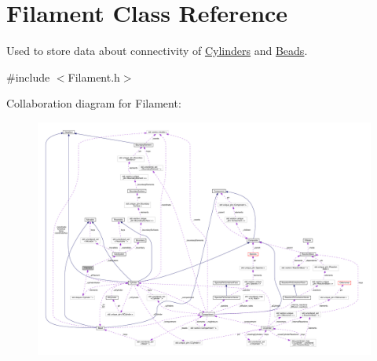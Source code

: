 \hypertarget{classFilament}{\section{Filament Class Reference}
\label{classFilament}
}


Used to store data about connectivity of \hyperlink{classCylinder}{Cylinders} and \hyperlink{classBead}{Beads}.  




{\ttfamily \#include $<$Filament.\+h$>$}



Collaboration diagram for Filament\+:\nopagebreak
\begin{figure}[H]
\begin{center}
\leavevmode
\includegraphics[width=350pt]{classFilament__coll__graph}
\end{center}
\end{figure}
